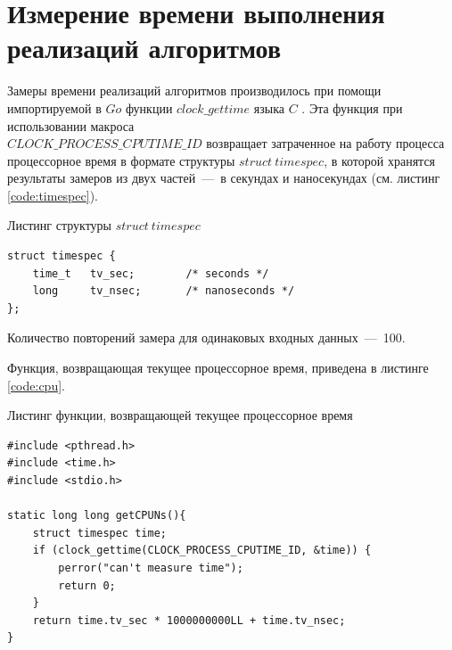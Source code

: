 \begin{table}[H]
\begin{center}
\begin{tabular}{
    |S[table-format=5.2]
    |S[table-format=5.2]
    |S[table-format=5.2]
    |S[table-format=5.2]
    |S[table-format=5.2]
    |S[table-format=5.2]|
    }
    \end{tabular}
  \end{center}
\end{table}

\section{Измерение времени выполнения реализаций алгоритмов}
Замеры времени реализаций алгоритмов производилось при помощи импортируемой в $Go$ функции $clock\_gettime$ языка $C$ \cite{item15}. Эта функция при использовании макроса \\ $CLOCK\_PROCESS\_CPUTIME\_ID$ возвращает затраченное на работу процесса процессорное время в формате структуры $struct\ timespec$, в которой хранятся результаты замеров из двух частей~---~в секундах и наносекундах (см. листинг \ref{code:timespec}).

\begin{code}
\caption{Листинг структуры $struct\ timespec$}
\label{code:timespec}

\begin{verbatim}
struct timespec {
	time_t   tv_sec;        /* seconds */
	long     tv_nsec;       /* nanoseconds */
};
\end{verbatim}
\end{code}

Количество повторений замера для одинаковых входных данных~---~100.

Функция, возвращающая текущее процессорное время, приведена в листинге \ref{code:cpu}.

\begin{code}
\caption{Листинг функции, возвращающей текущее процессорное время}
\label{code:cpu}

\begin{verbatim}
#include <pthread.h>
#include <time.h>
#include <stdio.h>

static long long getCPUNs(){
	struct timespec time;
	if (clock_gettime(CLOCK_PROCESS_CPUTIME_ID, &time)) {
		perror("can't measure time");
		return 0;
	}
	return time.tv_sec * 1000000000LL + time.tv_nsec;
}
\end{verbatim}
\end{code}

